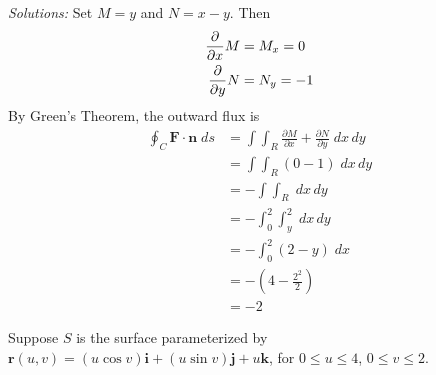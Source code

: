     \ifnum {} {\color{DarkBlue}  \textit{Solutions:} 
    Set $M=y$ and $N = x-y$. Then
    \begin{align}
        \frac{\partial}{\partial x} M &= M_x = 0 \\
        \frac{\partial}{\partial y} N &= N_y = -1
    \end{align}
    By Green's Theorem, the outward flux is 
    \begin{align*}
        \oint_C \mathbf F \cdot \mathbf n \;ds &= 
        \int\!\int_R  \frac{\partial M}{\partial x} + 
         \frac{\partial N}{\partial y} \;dx\,dy
         \\ 
         &=  \int\!\int_R  (0-1) \;dx\,dy \\          
         &= - \int\!\int_R  \;dx\,dy \\          
    & = - \int _0^2 \int_y ^2  \; dx \,dy 
     \\ 
    &= -\int_0^2 (2-y) \;dx \\
    &= - \left(4 - \frac{2^2}{2}\right) \\
    &= -2
    \end{align*}
    } 
   \else
      
   \fi
\fi 


\ifnum {}
\question[4]{} Suppose $S$ is the surface parameterized by $\mathbf r(u,v) = (u \cos v)\mathbf i + (u \sin v) \mathbf j + u\mathbf k$, for $0 \le u \le 4$, $0 \le v \le 2$. 


